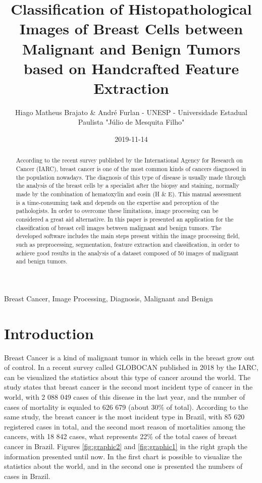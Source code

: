 \documentclass[conference]{IEEEtran}
\begin{document}
	\title{Classification of Histopathological Images of Breast Cells between Malignant and Benign Tumors based on Handcrafted Feature Extraction}
	\author{Hiago Matheus Brajato \& André Furlan - UNESP - Universidade Estadual Paulista "Júlio de Mesquita Filho"}
	\date{2019-11-14}
	\maketitle

	\begin{abstract}
		According to the recent survey published by the International Agency for Research on Cancer (IARC), breast cancer is one of the most common kinds of cancers diagnosed in the population nowadays. The diagnosis of this type of disease is usually made through the analysis of the breast cells by a specialist after the biopsy and staining, normally made by the combination of hematoxylin and eosin (H \& E). This manual assessment is a time-consuming task and depends on the expertise and perception of the pathologists. In order to overcome these limitations, image processing can be considered a great aid alternative. In this paper is presented an application for the classification of breast cell images between malignant and benign tumors. The developed software includes the main steps present within the image processing field, such as preprocessing, segmentation, feature extraction and classification, in order to achieve good results in the analysis of a dataset composed of 50 images of malignant and benign tumors.
	\end{abstract}
	
	\begin{IEEEkeywords}
		Breast Cancer, Image Processing, Diagnosis, Malignant and Benign
	\end{IEEEkeywords}

	\section{Introduction}	
		\par Breast Cancer is a kind of malignant tumor in which cells in the breast grow out of control. In a recent survey called GLOBOCAN \cite{GLOBOCAN} published in 2018 by the IARC, can be visualized the statistics about this type of cancer around the world. The study states that breast cancer is the second most incident type of cancer in the world, with 2 088 049 cases of this disease in the last year, and the number of cases of mortality is equaled to 626 679 (about 30\% of total). According to the same study, the breast cancer is the most incident type in Brazil, with 85 620 registered cases in total, and the second most reason of mortalities among the cancers, with 18 842 cases, what represents 22\% of the total cases of breast cancer in Brazil. Figures \ref{fig:graphic2} and \ref{fig:graphic1} in the right graph the information presented until now. In the first chart is possible to visualize the statistics about the world, and in the second one is presented the numbers of cases in Brazil.
		
\end{document}
